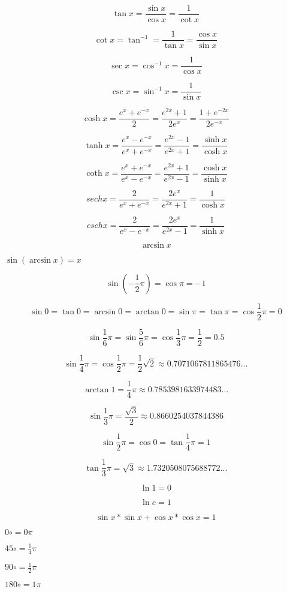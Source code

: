 \documentclass{article}
\begin{document}
\[\tan x = \frac{\sin x}{\cos x} = \frac{1}{\cot x}\]

\[\cot x = \tan^{-1} = \frac{1}{\tan x} = \frac{\cos x}{\sin x}\]

\[\sec x = \cos^{-1}x = \frac{1}{\cos x}\]

\[\csc x = \sin^{-1}x = \frac{1}{\sin x}\]

\[\cosh x = \frac{e^x + e^{-x}}{2} = \frac{e^{2x} + 1}{2e^x} = \frac{1 + e^{-2x}}{2e^{-x}}\]

\[\tanh x = \frac{e^x-e^{-x}}{e^x+e^{-x}} =
\frac{e^{2x}-1}{e^{2x}+1} = \frac{\sinh x}{\cosh x}\]

\[\coth x = \frac{e^x + e^{-x}}{e^x - e^{-x}} =
\frac{e^{2x} + 1}{e^{2x} - 1} = \frac{\cosh x}{\sinh x}\]

\[sech x = \frac{2}{e^x + e^{-x}} = \frac{2e^x}{e^{2x}+1} = \frac{1}{\cosh x}\]

\[csch x = \frac{2}{e^x - e^{-x}} = \frac{2e^x}{e^{2x}-1} = \frac{1}{\sinh x}\]

\[\arcsin x\]

$\sin(\arcsin x) = x$



\hrulefill

\[\sin(-\frac{1}{2}\pi) = \cos\pi = -1\]

\[\sin0 = \tan0 = \arcsin0 = \arctan0 = \sin\pi = \tan\pi = \cos\frac{1}{2}\pi = 0\]

\[\sin\frac{1}{6}\pi = \sin\frac{5}{6}\pi = \cos\frac{1}{3}\pi = \frac{1}{2} = 0.5\]

\[\sin\frac{1}{4}\pi = \cos\frac{1}{2}\pi = \frac{1}{2}\sqrt{2} \approx 0.7071067811865476...\]

\[\arctan{1} = \frac{1}{4}\pi \approx 0.7853981633974483...\]

\[\sin\frac{1}{3}\pi = \frac{\sqrt{3}}{2} \approx 0.8660254037844386\]

\[\sin\frac{1}{2}\pi = \cos0 = \tan\frac{1}{4}\pi = 1\]

\[\tan\frac{1}{3}\pi = \sqrt{3} \approx 1.7320508075688772...\]

\[\ln 1 = 0\]

\[\ln e = 1\]

\[\sin x * \sin x + \cos x * \cos x = 1\]

\hrulefill

$0\circ = 0\pi$

$45\circ = \frac{1}{4}\pi$

$90\circ = \frac{1}{2}\pi$

$180\circ = 1\pi$
\end{document}
